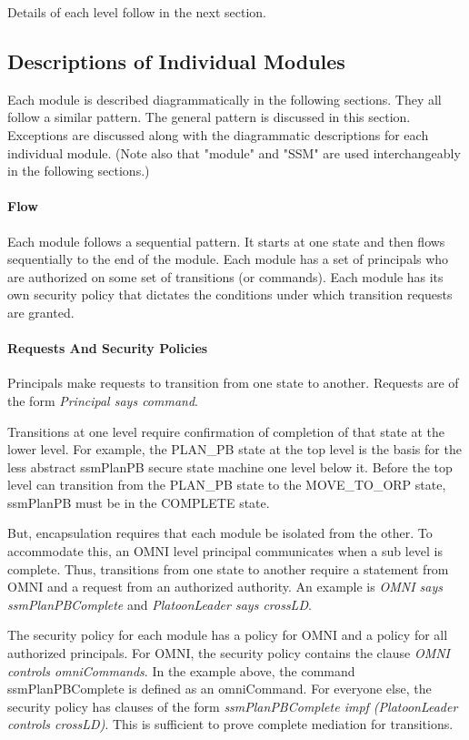 \documentclass[../../main/main.tex]{subfiles}
\begin{document}
Details of each level follow in the next section.

\subsection{Descriptions of Individual Modules}
Each module is described diagrammatically in the following sections.  They all follow a similar pattern.  The general pattern is discussed in this section.  Exceptions are discussed along with the diagrammatic descriptions for each individual module. (Note also that "module" and "SSM" are used interchangeably in the following sections.)

\paragraph*{Flow}
Each module follows a sequential pattern.  It starts at one state and then flows sequentially to the end of the module. Each module has a set of principals who are authorized on some set of transitions (or commands).  Each module has its own security policy that dictates the conditions under which transition requests are granted.  

\paragraph*{Requests And Security Policies}
Principals make requests to transition from one state to another.  Requests are of the form \textit{Principal says command}.  

Transitions at one level require confirmation of completion of that state at the lower level.  For example, the PLAN_PB state at the top level is the basis for the less abstract ssmPlanPB secure state machine one level below it.  Before the top level can transition from the PLAN_PB state to the MOVE_TO_ORP state, ssmPlanPB must be in the COMPLETE state.  

But, encapsulation requires that each module be isolated from the other.  To accommodate this, an OMNI level principal communicates when a sub level is complete. Thus, transitions from one state to another require a statement from OMNI and a request from an authorized authority.  An example is \textit{OMNI says ssmPlanPBComplete} and \textit{PlatoonLeader says crossLD}.

The security policy for each module has a policy for OMNI and a policy for all authorized principals.  For OMNI, the security policy contains the clause \textit{OMNI controls omniCommands}.  In the example above, the command ssmPlanPBComplete is defined as an omniCommand.  For everyone else, the security policy has clauses of the form \textit{ssmPlanPBComplete impf (PlatoonLeader controls crossLD)}.  This is sufficient to prove complete mediation for transitions.
\end{document}
